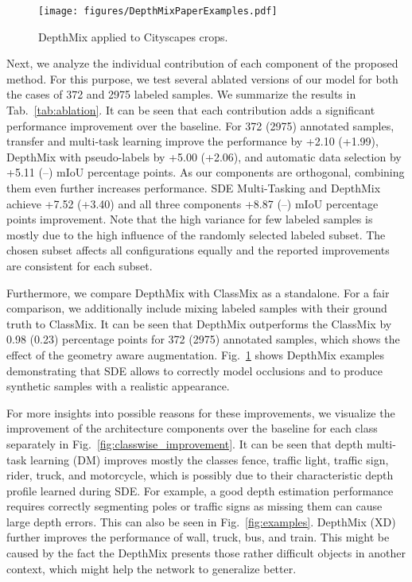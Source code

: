 \documentclass[final]{cvpr}
\begin{document}
\begin{figure}
    \centering
    \texttt{[image: figures/DepthMixPaperExamples.pdf]}
    \caption{DepthMix applied to Cityscapes crops.}
    \label{fig:depthmix_paper_examples}
\end{figure}

Next, we analyze the individual contribution of each component of the proposed method. For this purpose, we test several ablated versions of our model for both the cases of 372 and 2975 labeled samples. We summarize the results in Tab.~\ref{tab:ablation}. 
It can be seen that each contribution adds a significant performance improvement over the baseline. For 372 (2975) annotated samples, transfer and multi-task learning improve the performance by +2.10 (+1.99), DepthMix with pseudo-labels by +5.00 (+2.06), and automatic data selection by +5.11 (--) mIoU percentage points. As our components are orthogonal, combining them even further increases performance. SDE Multi-Tasking and DepthMix achieve +7.52 (+3.40) and all three components +8.87 (--) mIoU percentage points improvement.
Note that the high variance for few labeled samples is mostly due to the high influence of the randomly selected labeled subset. The chosen subset affects all configurations equally and the reported improvements are consistent for each subset.

Furthermore, we compare DepthMix with ClassMix as a standalone. For a fair comparison, we additionally include mixing labeled samples with their ground truth to ClassMix. It can be seen that DepthMix outperforms the ClassMix by 0.98 (0.23) percentage points for 372 (2975) annotated samples, which shows the effect of the geometry aware augmentation. Fig.~\ref{fig:depthmix_paper_examples} shows DepthMix examples demonstrating that SDE allows to correctly model occlusions and to produce synthetic samples with a realistic appearance.

For more insights into possible reasons for these improvements, we visualize the improvement of the architecture components over the baseline for each class separately in Fig.~\ref{fig:classwise_improvement}. It can be seen that depth multi-task learning (DM) improves mostly the classes fence, traffic light, traffic sign, rider, truck, and motorcycle, which is possibly due to their characteristic depth profile learned during SDE. For example, a good depth estimation performance requires correctly segmenting poles or traffic signs as missing them can cause large depth errors. This can also be seen in Fig.~\ref{fig:examples}. DepthMix (XD) further improves the performance of wall, truck, bus, and train. This might be caused by the fact the DepthMix presents those rather difficult objects in another context, which might help the network to generalize better. 
\end{document}
